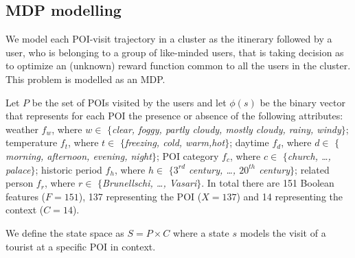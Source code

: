 \subsection{MDP modelling}

We model each POI-visit trajectory in a cluster as the itinerary followed by a user, who is belonging to a group of like-minded users, that is taking decision as to optimize an (unknown) reward function common to all the users in the cluster. This problem is modelled as an MDP. 

Let $P$ be the set of POIs visited by the users and let $\phi(s)$ 
be the binary vector that represents for each POI the presence or absence of the following attributes: weather \textit{$f_w$}, where $w \in$ \textit{$\{$clear, foggy, partly cloudy, mostly cloudy, rainy, windy$\}$}; temperature \textit{$f_t$}, where $t \in $ \textit{$\{$freezing, cold, warm,hot$\}$}; daytime \textit{$f_d$}, where $d \in$ \textit{$\{$morning, afternoon, evening, night$\}$}; 
POI category \textit{$f_c$}, where $c \in$ \textit{$\{$church, \dots, palace$\}$}; historic period \textit{$f_h$}, where $h \in$  \textit{$\{3^{rd}$ century, \dots, $20^{th}$ century$\}$}; related person \textit{$f_r$}, where $r \in$ \textit{$\{$Brunellschi, \dots, Vasari$\}$}. 
In total there are 151 Boolean features ($F=151$), 137 representing the POI ($X=137$) and 14 representing the context ($C=14$). 

We define the state space as $S = P \times C $ where a state $s$ models the visit of a tourist at a specific POI in context.

